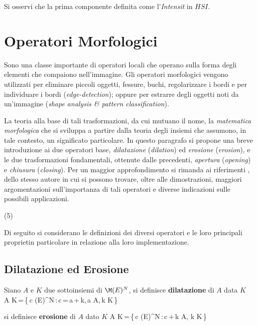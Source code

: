 Si osservi che la prima componente \e definita come l'{\it Intensit\a} in $HSI$.

\section{Operatori Morfologici}

Sono una classe importante di operatori locali che operano sulla forma degli elementi
che compaiono nell'immagine.
Gli operatori morfologici vengono utilizzati per eliminare piccoli oggetti, fessure,
buchi, regolarizzare i bordi e per individuare i bordi ({\it edge-detection}); oppure
per estrarre degli oggetti noti da un'immagine ({\it shape analysis \& pattern classification}).
 
La teoria alla base di tali trasformazioni, da cui mutuano il nome, \e la {\it matematica
morfologica} che si sviluppa a partire dalla teoria degli insiemi che assumono, in
tale contesto, un significato particolare.
In questo paragrafo si propone una breve introduzione ai due operatori base, {\it dilatazione}
({\it dilation}) ed {\it erosione} ({\it erosion}), e le due trasformazioni fondamentali,
ottenute dalle precedenti, {\it apertura} ({\it opening}) e {\it chiusura} ({\it closing}).
Per un maggior approfondimento si rimanda ai riferimenti \cite{Haralick87},\cite{Haralick92}
dello stesso autore in cui si possono trovare, oltre alle dimostrazioni, maggiori
argomentazioni sull'importanza di tali operatori e diverse indicazioni sulle possibili
applicazioni. 

\vs(5)

Di seguito si considerano le definizioni dei diversi operatori e le loro principali
propriet\a in particolare in relazione alla loro implementazione.

\subsection{Dilatazione ed Erosione}

\bdf

Siano $A$ e $K$ due sottoinsiemi di $\M(E)^N$, si definisce {\bf dilatazione} di $A$ data $K$
\be
A\,\oplus\,K\,=\,\{\,c\,\in\,\M(E)^N\,:\,c\,=\,a\,+\,k,\,a\,\in\,A,\,k\,\in\,K\,\}
\ee

si definisce {\bf erosione} di $A$ dato $K$
\be
A\,\ominus\,K\,=\,\{\,c\,\in\,\M(E)^N\,:\,c\,+\,k\,\in\,A,\,\forall\,k\,\in\,K\,\}
\ee

